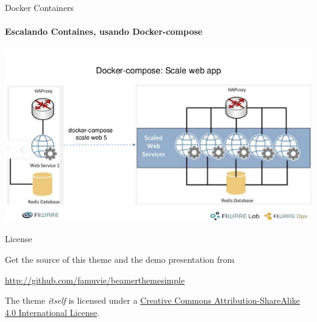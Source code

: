 \documentclass{beamer}
\begin{document}
\begin{frame}{Docker Containers}
    \framesubtitle{Escalando Containes, usando Docker-compose}
    \includegraphics[height=7.5cm]{img/docker-compose-scale.jpg}
\end{frame}


\begin{frame}{License}

  \begin{block}{Get the source of this theme and the demo presentation from}

  \begin{center}\url{http://github.com/famuvie/beamerthemesimple}\end{center}

  \end{block}
  
  The theme \emph{itself} is licensed under a
  \href{http://creativecommons.org/licenses/by-sa/4.0/}{Creative Commons
  Attribution-ShareAlike 4.0 International License}.

  \begin{center}\ccbysa\end{center}

\end{frame}
\end{document}
